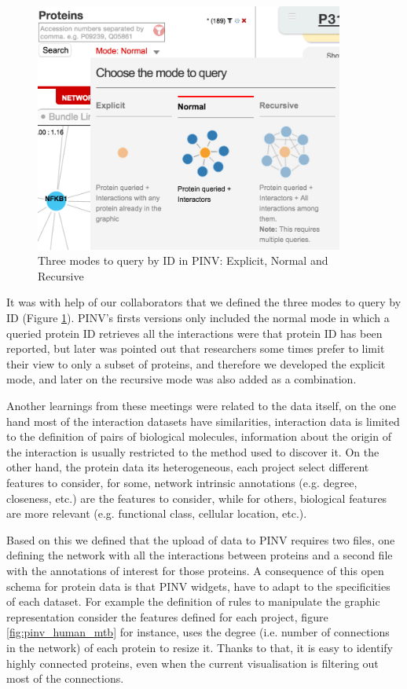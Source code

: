 \begin{figure}
\centering
\includegraphics[width=4in]{figures/pinv_modes_query.png}
\caption[Three modes to query by ID in PINV]{Three modes to query by ID in PINV: Explicit, Normal and Recursive
\label{fig:pinv_modes_query}}
\end{figure}

It was with help of our collaborators that we defined the three modes to query by ID (Figure \ref{fig:pinv_modes_query}). PINV's firsts versions only included the normal mode in which a queried protein ID retrieves all the interactions were that protein ID has been reported, but later was pointed out that researchers some times prefer to limit their view to only a subset of proteins, and therefore we developed the explicit mode, and later on the recursive mode was also added as a combination.

Another learnings from these meetings were related to the data itself, on the one hand most of the interaction datasets have similarities, interaction data is  limited to the definition of pairs of biological molecules, information about the origin of the interaction is usually restricted to the method used to discover it. On the other hand, the protein data its heterogeneous, each project select different features to consider, for some, network intrinsic annotations (e.g. degree, closeness, etc.) are the features to consider, while for others, biological features are more relevant (e.g. functional class, cellular location, etc.). 

Based on this we defined that the upload of data to PINV requires two files, one defining the network with all the interactions between proteins and a second file with the annotations of interest for those proteins. A consequence of this open schema for protein data is that PINV widgets, have to adapt to the specificities of each dataset. For example the definition of rules to manipulate the graphic representation consider the features defined for each project, figure \ref{fig:pinv_human_mtb} for instance, uses the degree (i.e. number of connections in the network) of each protein to resize it. Thanks to that, it is easy to identify highly connected proteins, even when the current visualisation is filtering out most of the connections.

